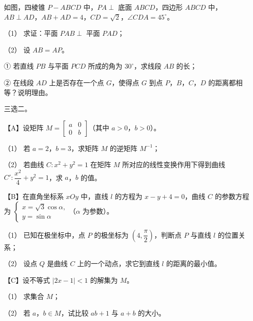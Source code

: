 \begin{question}
如图，四棱锥 $P-ABCD$ 中，$PA\perp$ 底面 $ABCD$，四边形 $ABCD$ 中，$AB\perp AD$，$AB+AD=4$，$CD=\sqrt2$，$\angle CDA=45^\circ$。

（1） 求证：平面 $PAB\perp$ 平面 $PAD$；

（2） 设 $AB=AP$。

① 若直线 $PB$ 与平面 $PCD$ 所成的角为 $30^\circ$，求线段 $AB$ 的长；

② 在线段 $AD$ 上是否存在一个点 $G$，使得点 $G$ 到点 $P$，$B$，$C$，$D$ 的距离都相等？说明理由。
\nopagebreak[4]
\begin{center}\end{center}
\nopagebreak[4]
\end{question}
\begin{question}
三选二。

【A】设矩阵 $M=\begin{bmatrix}a&0\\0&b\end{bmatrix}$（其中 $a>0$，$b>0$）。

（1） 若 $a=2$，$b=3$，求矩阵 $M$ 的逆矩阵 $M^{-1}$；

（2） 若曲线 $C:x^2+y^2=1$ 在矩阵 $M$ 所对应的线性变换作用下得到曲线 $C':\dfrac{x^2}4+y^2=1$，求 $a$，$b$ 的值。

【B】在直角坐标系 $xOy$ 中，直线 $l$ 的方程为 $x-y+4=0$，曲线 $C$ 的参数方程为 $\begin{cases}x=\sqrt3\cos\alpha,\\y=\sin\alpha\end{cases}$（$\alpha$ 为参数）。

（1） 已知在极坐标中，点 $P$ 的极坐标为 $\left(4,\dfrac\pi2\right)$，判断点 $P$ 与直线 $l$ 的位置关系；

（2） 设点 $Q$ 是曲线 $C$ 上的一个动点，求它到直线 $l$ 的距离的最小值。

【C】设不等式 $|2x-1|<1$ 的解集为 $M$。

（1） 求集合 $M$；

（2） 若 $a$，$b\in M$，试比较 $ab+1$ 与 $a+b$ 的大小。

\end{question}